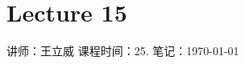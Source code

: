\chapter{Lecture 15}

\begin{center}
    讲师：王立威 \qquad
    课程时间：25. \qquad 
    笔记：\today
\end{center}

\bigskip

